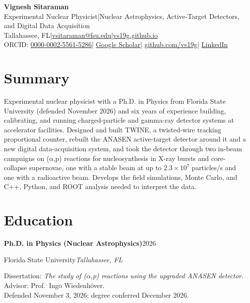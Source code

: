\documentclass[10pt,letterpaper]{article}
\newcommand{\entry}[4]{%
  \par\addvspace{4pt}\noindent\textbf{#1}\hfill #2\par\nopagebreak
  \noindent #3\hfill\textit{#4}\par\nopagebreak}
\newcommand{\ap}{(\ensuremath{\alpha},p)}
\newcommand{\sep}{\enspace|\enspace}
\begin{document}
\begin{center}
  {\color{accent}\fontsize{22}{26}\selectfont\bfseries Vignesh Sitaraman}\\[4pt]
  {\color{accent}Experimental Nuclear Physicist\sep Nuclear Astrophysics, Active-Target Detectors, and Digital Data Acquisition}\\[3pt]
  Tallahassee, FL\sep \href{mailto:vsitaraman@fsu.edu}{vsitaraman@fsu.edu}\sep \href{https://vs19g.github.io}{vs19g.github.io}\\[1pt]
  ORCID: \href{https://orcid.org/0000-0002-5561-5286}{0000-0002-5561-5286}\sep
  \href{https://scholar.google.com/citations?user=BjY0FunPZVgC}{Google Scholar}\sep
  \href{https://github.com/vs19g}{github.com/vs19g}\sep
  \href{https://www.linkedin.com/in/vignesh-sitaraman-1b5a62136}{LinkedIn}
\end{center}

\section{Summary}
Experimental nuclear physicist with a Ph.D. in Physics from Florida State University (defended November 2026) and six years of experience building, calibrating, and running charged-particle and gamma-ray detector systems at accelerator facilities. Designed and built TWINE, a twisted-wire tracking proportional counter, rebuilt the ANASEN active-target detector around it and a new digital data-acquisition system, and took the detector through two in-beam campaigns on \ap{} reactions for nucleosynthesis in X-ray bursts and core-collapse supernovae, one with a stable beam at up to $2.3\times10^{7}$ particles/s and one with a radioactive beam. Develops the field simulations, Monte Carlo, and C++, Python, and ROOT analysis needed to interpret the data.

\section{Education}
\entry{Ph.D. in Physics (Nuclear Astrophysics)}{2026}{Florida State University}{Tallahassee, FL}
Dissertation: \textit{The study of \ap{} reactions using the upgraded ANASEN detector}. Advisor: Prof.\ Ingo Wiedenhöver.\\
Defended November 3, 2026; degree conferred December 2026.
\end{document}
